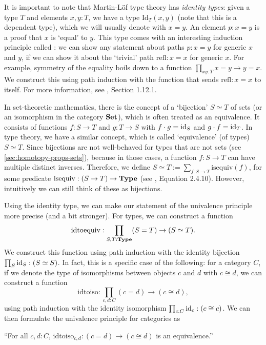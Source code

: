 It is important to note that Martin-Löf type theory has \textit{identity types}: given a type $ T $ and elements $ x, y: T $, we have a type $ \mathrm{Id}_T(x, y) $ (note that this is a dependent type), which we will usually denote with $ x = y $. An element $ p: x = y $ is a proof that $ x $ is `equal' to $ y $. This type comes with an interesting induction principle called : we can show any statement about paths $ p: x = y $ for generic $ x $ and $ y $, if we can show it about the `trivial' path $ \mathrm{refl}: x = x $ for generic $ x $. For example, symmetry of the equality boils down to a function $ \prod_{x y : T} x = y \to y = x $. We construct this using path induction with the function that sends $ \mathrm{refl}: x = x $ to itself. For more information, see \autocite{hottbook}, Section 1.12.1.

In set-theoretic mathematics, there is the concept of a `bijection' $ S \simeq T $ of sets (or an isomorphism in the category $ \mathbf{Set} $), which is often treated as an equivalence. It consists of functions $ f: S \to T $ and $ g: T \to S $ with $ f \cdot g = \text{id}_{S} $ and $ g \cdot f = \text{id}_{T} $. In type theory, we have a similar concept, which is called `equivalence' (of types) $ S \simeq T $. Since bijections are not well-behaved for types that are not sets (see \ref{sec:homotopy-props-sets}), because in those cases, a function $ f: S \to T $ can have multiple distinct inverses. Therefore, we define $ S \simeq T := \sum_{f: S \to T} \mathrm{isequiv}(f) $, for some predicate $ \mathrm{isequiv}: (S \to T) \to \mathbf{Type} $ (see \autocite{hottbook}, Equation 2.4.10). However, intuitively we can still think of these as bijections.

Using the identity type, we can make our statement of the univalence principle more precise (and a bit stronger). For types, we can construct a function
\[ \mathrm{idtoequiv}: \prod_{S, T: \mathbf{Type}} (S = T) \to (S \simeq T). \]
We construct this function using path induction with the identity bijection $ \prod_S \text{id}_{S}: (S \simeq S) $. In fact, this is a specific case of the following: for a category $ C $, if we denote the type of isomorphisms between objects $ c $ and $ d $ with $ c \cong d $, we can construct a function
\[ \mathrm{idtoiso}: \prod_{c, d: C} (c = d) \to (c \cong d), \]
using path induction with the identity isomorphism $ \prod_{c: C} \text{id}_{c}: (c \cong c) $. We can then formulate the univalence principle for categories as

\enquote{For all $ c, d : C $, $ \mathrm{idtoiso}_{c, d}: (c = d) \to (c \cong d) $ is an equivalence.}

